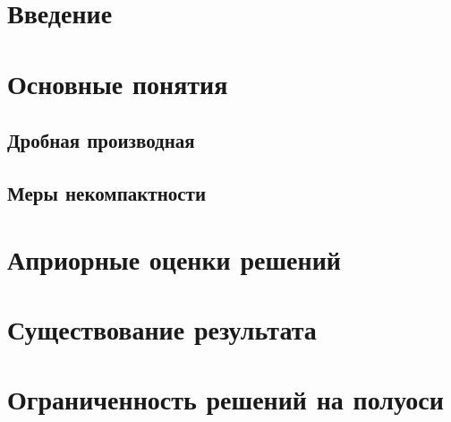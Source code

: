 \section{Введение}

\clearpage

\section{Основные понятия}

\subsection{Дробная производная}

\subsection{Меры некомпактности}

\clearpage

\section{Априорные оценки решений}

\clearpage

\section{Существование результата}

\clearpage

\section{Ограниченность решений на полуоси}

\clearpage


\nocite{*}

\printbibliography{}
